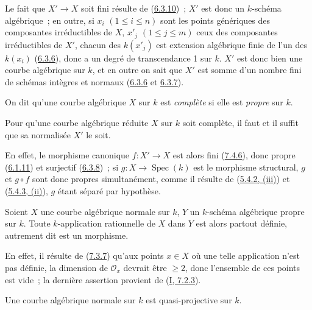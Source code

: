Le fait que $X'\to X$ soit fini résulte de
(\hyperref[II.6.3.10-fr]{6.3.10})~; $X'$ est donc un $k$-schéma algébrique~;
en outre, si $x_i$ $(1\leq i\leq n)$ sont les points génériques des composantes
irréductibles de $X$, $x'_j$ $(1\leq j\leq m)$ ceux des composantes
irréductibles de $X'$, chacun des $k(x'_j)$ est extension algébrique finie de
l'un des $k(x_i)$ (\hyperref[II.6.3.6-fr]{6.3.6}), donc a un degré de
transcendance 1 sur $k$. $X'$ est donc bien une courbe algébrique sur $k$, et
en outre on sait que $X'$ est somme d'un nombre fini de schémas intègres et
normaux (\hyperref[II.6.3.6-fr]{6.3.6} et
\hyperref[II.6.3.7-fr]{6.3.7}).

\begin{env}[7.4.7]
\label{II.7.4.7-fr}
On dit qu'une courbe algébrique $X$ sur $k$ est \emph{complète} si elle est
\emph{propre} sur $k$.
\end{env}

\begin{corollary}[7.4.8]
\label{II.7.4.8-fr}
Pour qu'une courbe algébrique réduite $X$ sur $k$ soit complète, il faut et il
suffit que sa normalisée $X'$ le soit.
\end{corollary}

En effet, le morphisme canonique $f:X'\to X$ est alors fini
(\hyperref[II.7.4.6-fr]{7.4.6}), donc propre
(\hyperref[II.6.1.11-fr]{6.1.11}) et surjectif
(\hyperref[II.6.3.8-fr]{6.3.8})~; si $g:X\to\operatorname{Spec}(k)$ est le
morphisme structural, $g$ et $g\circ f$ sont donc propres simultanément,
comme il résulte de (\hyperref[II.5.4.2-fr]{5.4.2, (iii)}) et
(\hyperref[II.5.4.3-fr]{5.4.3, (ii)}), $g$ étant séparé par hypothèse.

\begin{proposition}[7.4.9]
\label{II.7.4.9-fr}
Soient $X$ une courbe algébrique normale sur $k$, $Y$ un $k$-schéma algébrique
propre sur $k$. Toute $k$-application rationnelle de $X$ dans $Y$ est alors
partout définie, autrement dit est un morphisme.
\end{proposition}

En effet, il résulte de (\hyperref[II.7.3.7-fr]{7.3.7}) qu'aux points $x\in X$
où une telle application n'est pas définie, la dimension de $\mathcal{O}_x$
devrait être $\geq2$, donc l'ensemble de ces points est vide~; la dernière
assertion provient de (\hyperref[I.7.2.3-fr]{I, 7.2.3}).

\begin{corollary}[7.4.10]
\label{II.7.4.10-fr}
Une courbe algébrique normale sur $k$ est quasi-projective sur $k$.
\end{corollary}

